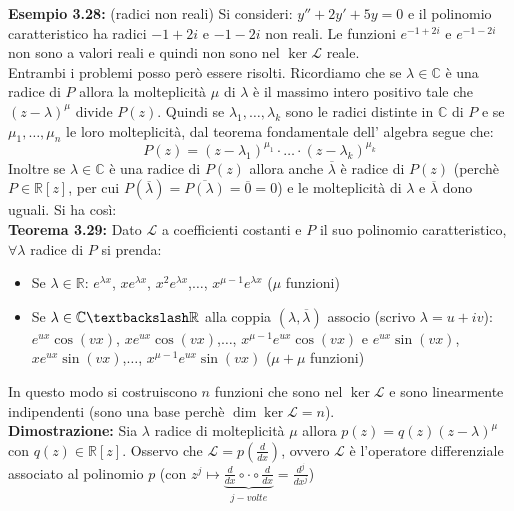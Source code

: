 \documentclass[a4paper,11pt,titlepage]{book}
\begin{document}
\textbf{Esempio 3.28: } (radici non reali) Si consideri: $y''+2y'+5y=0$ e il polinomio caratteristico ha radici $-1+2i$ e $-1-2i$ non reali. Le funzioni $e^{-1+2i}$ e $e^{-1-2i}$ non sono a valori reali e quindi non sono nel $\ker\mathcal{L}$ reale.\\

Entrambi i problemi posso però essere risolti. Ricordiamo che se $\lambda\in\mathbb{C}$ è una radice di $P$ allora la molteplicità $\mu$ di $\lambda$ è il massimo intero positivo tale che $(z-\lambda)^\mu$ divide $P(z)$. Quindi se $\lambda_1,\ldots,\lambda_k$ sono le radici distinte in $\mathbb{C}$ di $P$ e se $\mu_1,\ldots,\mu_n$ le loro molteplicità, dal teorema fondamentale dell' algebra segue che: 
$$P(z)=(z-\lambda_1)^{\mu_1}\cdot\ldots\cdot(z-\lambda_k)^{\mu_k}$$
Inoltre se $\lambda\in\mathbb{C}$ è una radice di $P(z)$ allora anche $\overline{\lambda}$ è radice di $P(z)$ (perchè $P\in\mathbb{R}[z]$, per cui $P(\overline{\lambda})=\overline{P(\lambda)}=\overline{0}=0$) e le molteplicità di $\lambda$ e $\overline{\lambda}$ dono uguali. Si ha così:\\

\textbf{Teorema 3.29: }Dato $\mathcal{L}$ a coefficienti costanti e $P$ il suo polinomio caratteristico, $\forall\lambda$ radice di $P$ si prenda:\begin{itemize}
\item Se $\lambda\in\mathbb{R}$: $e^{\lambda x}$, $xe^{\lambda x}$, $x^2e^{\lambda x}$,$\ldots$, $x^{\mu-1}e^{\lambda x}$ ($\mu$ funzioni)
\item Se $\lambda\in\mathbb{C}\textbackslash\mathbb{R}$ alla coppia $(\lambda,\overline{\lambda})$ associo (scrivo $\lambda=u+iv$): $e^{ux}\cos(vx)$, $xe^{ux}\cos(vx)$,$\ldots$, $x^{\mu-1}e^{ux}\cos(vx)$ e $e^{ux}\sin(vx)$, $xe^{ux}\sin(vx)$,$\ldots$, $x^{\mu-1}e^{ux}\sin(vx)$ ($\mu+\mu$ funzioni)
\end{itemize} In questo modo si costruiscono $n$ funzioni che sono nel $\ker\mathcal{L}$ e sono linearmente indipendenti (sono una base perchè $\dim\ker\mathcal{L}=n$). \\

\textbf{Dimostrazione:} Sia $\lambda$ radice di molteplicità $\mu$ allora $p(z)=q(z)(z-\lambda)^\mu$ con $q(z)\in\mathbb{R}[z]$. Osservo che $\mathcal{L}=p(\frac{d}{dx})$, ovvero $\mathcal{L}$ è l'operatore differenziale associato al polinomio $p$ (con $z^j\mapsto\underbrace{\frac{d}{dx}\circ\cdot\circ{\frac{d}{dx}}}_{j-volte}=\frac{d^j}{dx^j}$)\\
\end{document}

